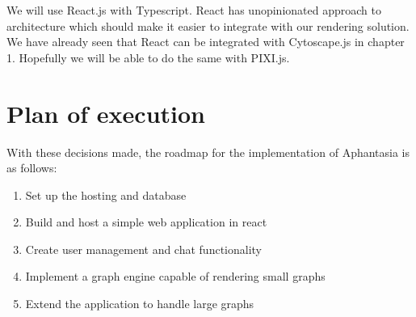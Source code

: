 We will use React.js with Typescript.
React has unopinionated approach to architecture which should make it easier to integrate with our rendering solution.
We have already seen that React can be integrated with Cytoscape.js in chapter 1.
Hopefully we will be able to do the same with PIXI.js.

\section{Plan of execution}
With these decisions made, the roadmap for the implementation of Aphantasia is as follows:

\begin{enumerate}
    \item Set up the hosting and database
    \item Build and host a simple web application in react
    \item Create user management and chat functionality
    \item Implement a graph engine capable of rendering small graphs
    \item Extend the application to handle large graphs
\end{enumerate}